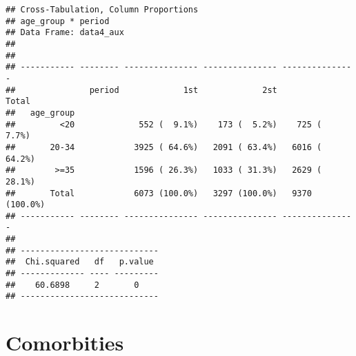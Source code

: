 \documentclass[
]{article}
\begin{document}
\begin{verbatim}
## Cross-Tabulation, Column Proportions  
## age_group * period  
## Data Frame: data4_aux  
## 
## 
## ----------- -------- --------------- --------------- ---------------
##               period             1st             2st           Total
##   age_group                                                         
##         <20             552 (  9.1%)    173 (  5.2%)    725 (  7.7%)
##       20-34            3925 ( 64.6%)   2091 ( 63.4%)   6016 ( 64.2%)
##        >=35            1596 ( 26.3%)   1033 ( 31.3%)   2629 ( 28.1%)
##       Total            6073 (100.0%)   3297 (100.0%)   9370 (100.0%)
## ----------- -------- --------------- --------------- ---------------
## 
## ----------------------------
##  Chi.squared   df   p.value 
## ------------- ---- ---------
##    60.6898     2       0    
## ----------------------------
\end{verbatim}

\hypertarget{comorbities}{%
\section{Comorbities}\label{comorbities}}
\end{document}
